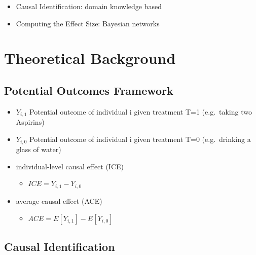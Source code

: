 \documentclass[]{book}
\providecommand{\tightlist}{%
  \setlength{\itemsep}{0pt}\setlength{\parskip}{0pt}}
\begin{document}
\begin{itemize}
\tightlist
\item
  Causal Identification: domain knowledge based
\item
  Computing the Effect Size: Bayesian networks
\end{itemize}

\hypertarget{theoretical-background}{%
\section{Theoretical Background}\label{theoretical-background}}

\hypertarget{potential-outcomes-framework}{%
\subsection{Potential Outcomes Framework}\label{potential-outcomes-framework}}

\begin{itemize}
\tightlist
\item
  \(Y_{i,1}\) Potential outcome of individual i given treatment T=1 (e.g.~taking two Aspirins)
\item
  \(Y_{i,0}\) Potential outcome of individual i given treatment T=0 (e.g.~drinking a glass of water)
\item
  individual-level causal effect (ICE)

  \begin{itemize}
  \tightlist
  \item
    \(ICE=Y_{i,1} −Y_{i,0}\)
  \end{itemize}
\item
  average causal effect (ACE)

  \begin{itemize}
  \tightlist
  \item
    \(ACE = E[Y_{i,1}] −E[Y_{i,0}]\)
  \end{itemize}
\end{itemize}

\hypertarget{causal-identification}{%
\subsection{Causal Identification}\label{causal-identification}}
\end{document}

